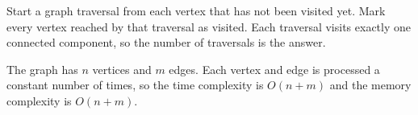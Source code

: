 Start a graph traversal from each vertex that has not been visited yet. Mark every vertex reached by that traversal as visited. Each traversal visits exactly one connected component, so the number of traversals is the answer.

The graph has $n$ vertices and $m$ edges. Each vertex and edge is processed a constant number of times, so the time complexity is $O(n+m)$ and the memory complexity is $O(n+m)$.
